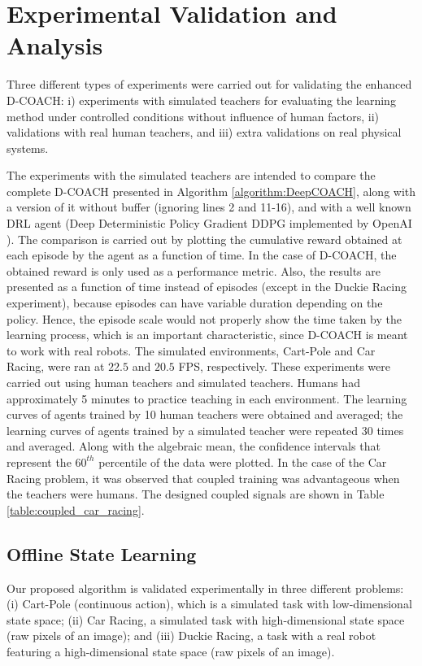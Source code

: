 \chapter{Experimental Validation and Analysis}
Three different types of experiments were carried out for validating the enhanced D-COACH: i) experiments with simulated teachers for evaluating the learning method under controlled conditions without influence of human factors, ii) validations with real human teachers, and iii) extra validations on real physical systems.

The experiments with the simulated teachers are intended to compare the complete D-COACH presented in Algorithm \ref{algorithm:DeepCOACH}, along with a version of it without buffer (ignoring lines 2 and 11-16), and with a well known DRL agent (Deep Deterministic Policy Gradient DDPG \cite{Lillicrap2015} implemented by OpenAI \cite{baselines}). The comparison is carried out by plotting the cumulative reward obtained at each episode by the agent as a function of time. In the case of D-COACH, the obtained reward is only used as a performance metric. Also, the results are presented as a function of time instead of episodes (except in the Duckie Racing experiment), because episodes can have variable duration depending on the policy. Hence, the episode scale would not properly show the time taken by the learning process, which is an important characteristic, since D-COACH is meant to work with real robots. The simulated environments, Cart-Pole and Car Racing, were ran at $22.5$ and $20.5$ FPS, respectively. These experiments were carried out using human teachers and simulated teachers. Humans had approximately 5 minutes to practice teaching in each environment. The learning curves of agents trained by 10 human teachers were obtained and averaged; the learning curves of agents trained by a simulated teacher were repeated 30 times and averaged. Along with the algebraic mean, the confidence intervals that represent the $60^{th}$ percentile of the data were plotted. In the case of the Car Racing problem, it was observed that coupled training was advantageous when the teachers were humans. The designed coupled signals are shown in Table \ref{table:coupled_car_racing}.

\section{Offline State Learning}
Our proposed algorithm is validated experimentally in three different problems: (i) Cart-Pole (continuous action), which is a simulated task with low-dimensional state space; (ii) Car Racing, a simulated task with high-dimensional state space (raw pixels of an image); and (iii) Duckie Racing, a task with a real robot featuring a high-dimensional state space (raw pixels of an image). 

